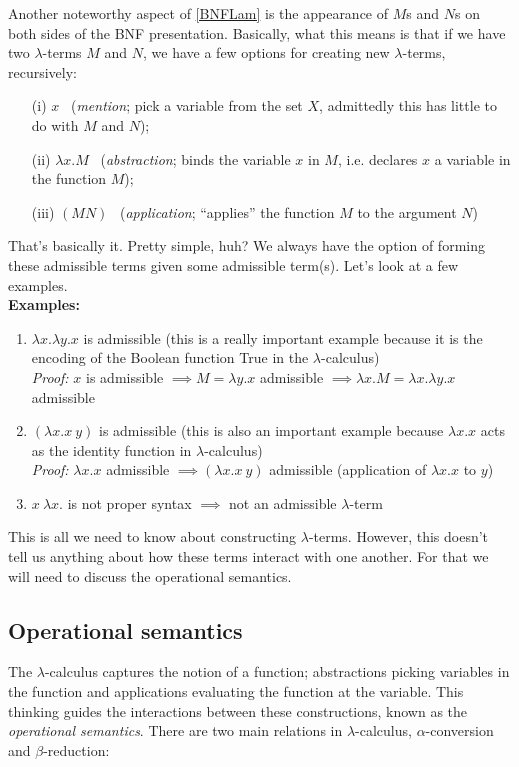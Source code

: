 \documentclass[12pt]{article}
\numberwithin{equation}{section}
\begin{document}
Another noteworthy aspect of \eqref{BNFLam} is the appearance of $M$s and $N$s on both sides of the BNF presentation. Basically, what this means is that if we have two $\lambda$-terms $M$ and $N$, we have a few options for creating new $\lambda$-terms, recursively:
\begin{enumerate} 
\item[(i)] $x$ \ (\emph{mention}; pick a variable from the set $X$, admittedly this has little to do with $M$ and $N$);
\item[(ii)] $\lambda x. M$ \ (\emph{abstraction}; binds the variable $x$ in $M$, i.e. declares $x$ a variable in the function $M$);
\item[(iii)] $(M N)$ \ (\emph{application}; ``applies'' the function $M$ to the argument $N$)
\end{enumerate}
That's basically it. Pretty simple, huh? We always have the option of forming these admissible terms given some admissible term(s). Let's look at a few examples. \\

\noindent \textbf{Examples:}
\begin{enumerate}
\item $\lambda x. \lambda y. x$ is admissible (this is a really important example because it is the encoding of the Boolean function True in the $\lambda$-calculus) \\
\emph{Proof:} $x$ is admissible $\implies M = \lambda y. x$ admissible $\implies \lambda x. M =\lambda x. \lambda y. x$ admissible

\item $(\lambda x. x \ y)$ is admissible (this is also an important example because $\lambda x. x$ acts as the identity function in $\lambda$-calculus) \\
\emph{Proof:} $\lambda x. x$ admissible $\implies (\lambda x. x \ y)$ admissible (application of $\lambda x. x$ to $y$)

\item $x \ \lambda x.$ is not proper syntax $\implies$ not an admissible $\lambda$-term
\end{enumerate}

This is all we need to know about constructing $\lambda$-terms. However, this doesn't tell us anything about how these terms interact with one another. For that we will need to discuss the operational semantics.

\subsection{Operational semantics}
The $\lambda$-calculus captures the notion of a function; abstractions picking variables in the function and applications evaluating the function at the variable. This thinking guides the interactions between these constructions, known as the \emph{operational semantics}. There are two main relations in $\lambda$-calculus, $\alpha$-conversion and $\beta$-reduction:
\end{document}
